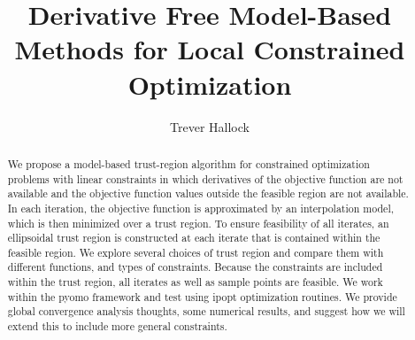 \documentclass{article}
\title{Derivative Free Model-Based Methods for Local Constrained Optimization}
\author{Trever Hallock}
\makeatletter
\theoremstyle{case}
\DeclareMathOperator*{\argmin}{arg\,min}
\def\BState{\State\hskip-\ALG@thistlm}
\let\oldref\ref
\renewcommand{\ref}[1]{(\oldref{#1})}
\makeatother
\begin{document}
%
%
%
%
%
%
%
%
%




\maketitle

\begin{abstract}

We propose a model-based trust-region algorithm for constrained optimization problems with linear constraints in which derivatives of the objective function are not available and the objective function values outside the feasible region are not available.
In each iteration, the objective function is approximated by an interpolation model, which is then minimized over a trust region.
To ensure feasibility of all iterates, an ellipsoidal trust region is constructed at each iterate that is contained within the feasible region.
We explore several choices of trust region and compare them with different functions, and types of constraints.
Because the constraints are included within the trust region, all iterates as well as sample points are feasible.
We work within the pyomo framework and test using ipopt optimization routines. We provide global convergence analysis thoughts, some numerical results, and suggest how we will extend this to include more general constraints.

\end{abstract}

\newpage
\end{document}
